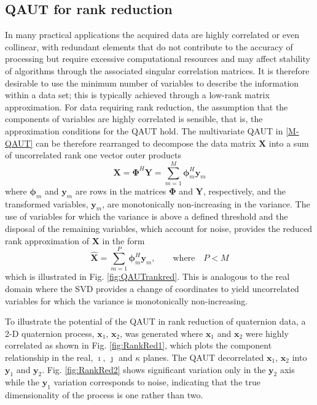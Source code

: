 \documentclass[review]{elsarticle}
\theoremstyle{plain}
\theoremstyle{remark}
\theoremstyle{plain}
\theoremstyle{definition}
\theoremstyle{prop}
\theoremstyle{definition}
\theoremstyle{plain}
\theoremstyle{plain}
\begin{document}
\subsection{QAUT for rank reduction}
In many practical applications the acquired data are highly correlated or even collinear, with redundant elements that do not contribute to the accuracy of processing but require excessive computational resources and may affect stability of algorithms through the associated singular correlation matrices. It is therefore desirable to use the minimum number of variables to describe the information within a data set; this is typically achieved through a low-rank matrix approximation. 
For data requiring rank reduction, the assumption that the components of variables are highly correlated is sensible, that is, the approximation conditions for the QAUT hold. 
The multivariate QAUT in \eqref{M-QAUT} can be therefore rearranged to decompose the data matrix $\mathbf{X}$ into a sum of uncorrelated rank one vector outer products 
\[\mathbf{X}=\boldsymbol{\Phi}^H\mathbf{Y}=\underset{m=1}{\overset{M}{\sum}}\boldsymbol{\phi}_m^{H}\mathbf{y}_m\]
where $\boldsymbol{\phi}_m$ and $\mathbf{y}_m$ are rows in the matrices $\boldsymbol{\Phi}$ and $\mathbf{Y}$, respectively, and the transformed variables, $\mathbf{y}_m$, are monotonically non-increasing in the variance. The use of variables for which the variance is above a defined threshold and the disposal of the remaining variables, which account for noise, provides the reduced rank approximation of $\mathbf{X}$ in the form
\[\hat{\mathbf{X}}=\underset{m=1}{\overset{P}{\sum}}\boldsymbol{\phi}_m^{H}\mathbf{y}_m,  \quad \quad \text{where} \quad P<M\]
which is illustrated in Fig. \ref{fig:QAUTrankred}. This is analogous to the real domain where the SVD provides a change of coordinates to yield uncorrelated variables for which the variance is monotonically non-increasing.

To illustrate the potential of the QAUT in rank reduction of quaternion data, a 2-D quaternion process, $\mathbf{x}_1$, $\mathbf{x}_2$, was generated where $\mathbf{x}_1$ and $\mathbf{x}_2$ were highly correlated as shown in Fig. \ref{fig:RankRed1}, which plots the component relationship in the real, $\imath$, $\jmath$ and $\kappa$ planes. The QAUT decorrelated $\mathbf{x}_1$, $\mathbf{x}_2$ into $\mathbf{y}_1$ and $\mathbf{y}_2$. Fig. \ref{fig:RankRed2} shows significant variation only in the $\mathbf{y}_2$ axis while the $\mathbf{y}_1$ variation corresponds to noise, indicating that the true dimensionality of the process is one rather than two.
\end{document}
